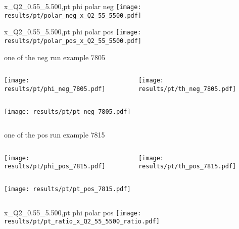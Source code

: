 \begin{frame}{x\_Q2\_0.55\_5.500,pt phi polar neg}
\texttt{[image: results/pt/polar\_neg\_x\_Q2\_55\_5500.pdf]}
\end{frame}
\begin{frame}{x\_Q2\_0.55\_5.500,pt phi polar pos}
\texttt{[image: results/pt/polar\_pos\_x\_Q2\_55\_5500.pdf]}
\end{frame}
\begin{frame}{one of the neg run example 7805}
\begin{columns}
\begin{column}[T]{0.5\textwidth}
\texttt{[image: results/pt/phi\_neg\_7805.pdf]}
\end{column}
\begin{column}[T]{0.5\textwidth}
\texttt{[image: results/pt/th\_neg\_7805.pdf]}
\end{column}
\end{columns}
\begin{columns}
\begin{column}[T]{0.5\textwidth}
\texttt{[image: results/pt/pt\_neg\_7805.pdf]}
\end{column}
\begin{column}[T]{0.5\textwidth}
\end{column}
\end{columns}
\end{frame}
\begin{frame}{one of the pos run example 7815}
\begin{columns}
\begin{column}[T]{0.5\textwidth}
\texttt{[image: results/pt/phi\_pos\_7815.pdf]}
\end{column}
\begin{column}[T]{0.5\textwidth}
\texttt{[image: results/pt/th\_pos\_7815.pdf]}
\end{column}
\end{columns}
\begin{columns}
\begin{column}[T]{0.5\textwidth}
\texttt{[image: results/pt/pt\_pos\_7815.pdf]}
\end{column}
\begin{column}[T]{0.5\textwidth}
\end{column}
\end{columns}
\end{frame}
\begin{frame}{x\_Q2\_0.55\_5.500,pt phi polar pos}
\texttt{[image: results/pt/pt\_ratio\_x\_Q2\_55\_5500\_ratio.pdf]}
\end{frame}
